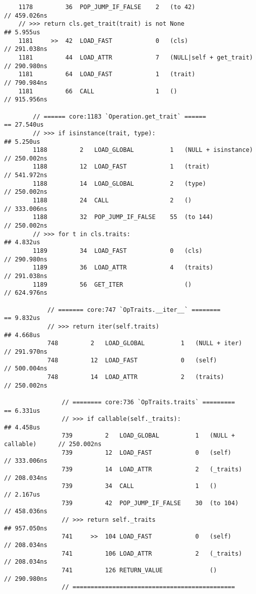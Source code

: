 \begin{code}
\begin{verbatim}
    1178         36  POP_JUMP_IF_FALSE    2   (to 42)                           // 459.026ns
    // >>> return cls.get_trait(trait) is not None                              ## 5.955us
    1181     >>  42  LOAD_FAST            0   (cls)                             // 291.038ns
    1181         44  LOAD_ATTR            7   (NULL|self + get_trait)           // 290.980ns
    1181         64  LOAD_FAST            1   (trait)                           // 790.984ns
    1181         66  CALL                 1   ()                                // 915.956ns

        // ====== core:1183 `Operation.get_trait` ======                        == 27.540us
        // >>> if isinstance(trait, type):                                      ## 5.250us
        1188         2   LOAD_GLOBAL          1   (NULL + isinstance)           // 250.002ns
        1188         12  LOAD_FAST            1   (trait)                       // 541.972ns
        1188         14  LOAD_GLOBAL          2   (type)                        // 250.002ns
        1188         24  CALL                 2   ()                            // 333.006ns
        1188         32  POP_JUMP_IF_FALSE    55  (to 144)                      // 250.002ns
        // >>> for t in cls.traits:                                             ## 4.832us
        1189         34  LOAD_FAST            0   (cls)                         // 290.980ns
        1189         36  LOAD_ATTR            4   (traits)                      // 291.038ns
        1189         56  GET_ITER                 ()                            // 624.976ns

            // ======= core:747 `OpTraits.__iter__` ========                    == 9.832us
            // >>> return iter(self.traits)                                     ## 4.668us
            748         2   LOAD_GLOBAL          1   (NULL + iter)              // 291.970ns
            748         12  LOAD_FAST            0   (self)                     // 500.004ns
            748         14  LOAD_ATTR            2   (traits)                   // 250.002ns

                // ======== core:736 `OpTraits.traits` =========                == 6.331us
                // >>> if callable(self._traits):                               ## 4.458us
                739         2   LOAD_GLOBAL          1   (NULL + callable)      // 250.002ns
                739         12  LOAD_FAST            0   (self)                 // 333.006ns
                739         14  LOAD_ATTR            2   (_traits)              // 208.034ns
                739         34  CALL                 1   ()                     // 2.167us
                739         42  POP_JUMP_IF_FALSE    30  (to 104)               // 458.036ns
                // >>> return self._traits                                      ## 957.050ns
                741     >>  104 LOAD_FAST            0   (self)                 // 208.034ns
                741         106 LOAD_ATTR            2   (_traits)              // 208.034ns
                741         126 RETURN_VALUE             ()                     // 290.980ns
                // =============================================


\end{verbatim}
\end{code}
